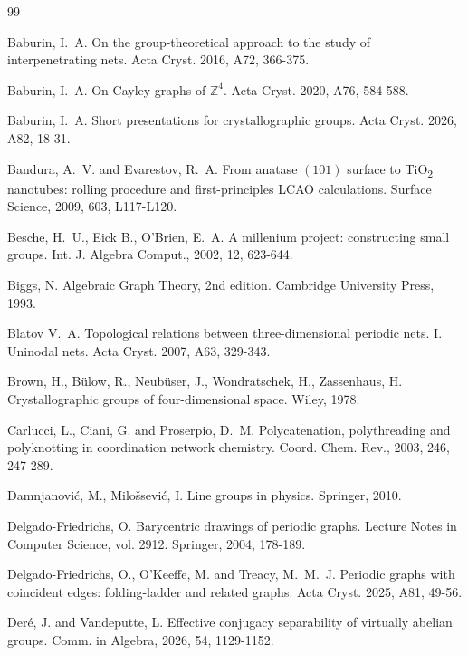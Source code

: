 \documentclass[11pt,a4paper]{article}
\newcommand{\Z}{\mathbb Z}
\begin{document}
\begin{thebibliography}{99}

\setlength\itemsep{-0.01cm}

\begin{small}

 Baburin, I.~A. On the group-theoretical approach to the study of interpenetrating nets. Acta Cryst. 2016, A72, 366-375.

 Baburin, I.~A. On Cayley graphs of $\Z^4$. Acta Cryst. 2020, A76, 584-588.

 Baburin, I.~A. Short presentations for crystallographic groups. Acta Cryst. 2026, A82, 18-31.

 Bandura, A.~V. and Evarestov, R.~A. From anatase $(101)$ surface to TiO\textsubscript{2} nanotubes: rolling procedure and ﬁrst-principles LCAO calculations. Surface Science, 2009, 603, L117-L120.

 Besche, H.~U., Eick B., O'Brien, E.~A. A millenium project: constructing small groups. Int. J. Algebra Comput., 2002, 12, 623-644.

 Biggs, N. Algebraic Graph Theory, 2nd edition. Cambridge University Press, 1993.

 Blatov V.~A. Topological relations between three-dimensional periodic nets. I. Uninodal nets. Acta Cryst. 2007, A63, 329-343.

 Brown, H., B{\"u}low, R., Neub{\"u}ser, J., Wondratschek, H., Zassenhaus, H. Crystallographic groups of four-dimensional space. Wiley, 1978.

 Carlucci, L., Ciani, G. and Proserpio, D.~M. Polycatenation, polythreading and polyknotting in coordination network chemistry. Coord. Chem. Rev., 2003, 246, 247-289.

  Damnjanovi{\'c}, M., Milo{\v{s}}sevi{\'c}, I. Line groups in physics. Springer, 2010.

 Delgado-Friedrichs, O. Barycentric drawings of periodic graphs. Lecture Notes in Computer Science, vol. 2912. Springer, 2004, 178-189.

 Delgado-Friedrichs, O., O'Keeffe, M. and Treacy, M.~M.~J. Periodic graphs with coincident edges: folding-ladder and related graphs. Acta Cryst. 2025, A81, 49-56.

 Der\'e, J. and Vandeputte, L. Effective conjugacy separability of virtually abelian groups. Comm. in Algebra, 2026, 54, 1129-1152.


\end{small}
\end{thebibliography}
\end{document}
